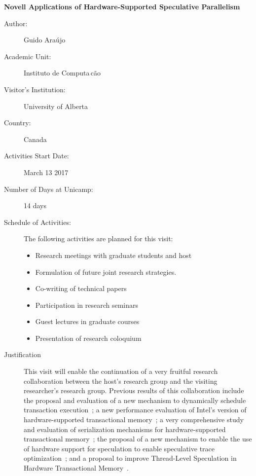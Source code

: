 \documentclass[10pt]{article}
\begin{document}
\hyphenation{}

{\bf Novell Applications of Hardware-Supported Speculative Parallelism}
%
%


\begin{description}
\item[Author:] Guido Ara\'ujo
\item[Academic Unit:] Instituto de Computa\,{c}\~ao
\item[Visitor's Institution:] University of Alberta
\item[Country:] Canada
\item[Activities Start Date:] March 13 2017
\item[Number of Days at Unicamp:] 14 days
\item[Schedule of Activities:]  The following activities are planned for this visit:\\
	\begin{itemize}
	\item Research meetings with graduate students and host
	\item Formulation of future joint research strategies.
	\item Co-writing of technical papers
	\item Participation in research seminars
	\item Guest lectures in graduate courses
	\item Presentation of research coloquium
	\end{itemize}

\item[Justification]

This visit will enable the continuation of a very fruitful research collaboration between the host's research group and the visiting researcher's research group. Previous results of this collaboration include the proposal and evaluation of a new mechanism to dynamically schedule transaction execution~\cite{PereiraICPP14}; a new performance evaluation of Intel's version of hardware-supported transactional memory~\cite{PereiraSBAC14,PereiraParCo16}; a very comprehensive study and evaluation of serialization mechanisms for hardware-supported transactional memory~\cite{GaudetSBAC15}; the proposal of a new mechanism to enable the use of hardware support for speculation to enable speculative trace optimization~\cite{SalamancaWAMCA15}; and a proposal to improve Thread-Level Speculation in Hardware Transactional Memory~\cite{SalamancaIPDPS16}. 


\end{description}
\end{document}
